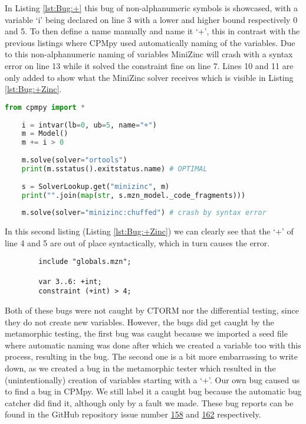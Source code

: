 In Listing \ref{lst:Bug:+} this bug of non-alphanumeric symbols is showcased, with a variable ‘i’ being declared on line 3 with a lower and higher bound respectively 0 and 5. To then define a name manually and name it ‘+’, this in contrast with the previous listings where CPMpy used automatically naming of the variables. Due to this non-alphanumeric naming of variables MiniZinc will crash with a syntax error on line 13 while it solved the constraint fine on line 7. Lines 10 and 11 are only added to show what the MiniZinc solver receives which is visible in Listing \ref{lst:Bug:+Zinc}. 

\begin{lstlisting}[language=python, label={lst:Bug:+}, caption={A bug showcasing that the naming of CPMpy’s variables is less strict than MiniZinc’s.}]
	from cpmpy import *
	
	i = intvar(lb=0, ub=5, name="+")
	m = Model()
	m += i > 0
	
	m.solve(solver="ortools")
	print(m.sstatus().exitstatus.name) # OPTIMAL
	
	s = SolverLookup.get("minizinc", m)
	print("".join(map(str, s.mzn_model._code_fragments)))
	
	m.solve(solver="minizinc:chuffed") # crash by syntax error
\end{lstlisting}

\noindent In this second listing (Listing \ref{lst:Bug:+Zinc}) we can clearly see that the ‘+’ of line 4 and 5 are out of place syntactically, which in turn causes the error.

\begin{lstlisting}[language=minizinc, label={lst:Bug:+Zinc}, caption={The resulting Zinc code from Listing \ref{lst:Bug:+} used by Minzinc.}]
		% Generated by CPMpy
		include "globals.mzn";
		
		var 3..6: +int;
		constraint (+int) > 4;
\end{lstlisting}

Both of these bugs were not caught by CTORM nor the differential testing, since they do not create new variables. However, the bugs did get caught by the metamorphic testing, the first bug was caught because we imported a seed file where automatic naming was done after which we created a variable too with this process, resulting in the bug. The second one is a bit more embarrassing to write down, as we created a bug in the metamorphic tester which resulted in the (unintentionally) creation of variables starting with a ‘+’. Our own bug caused us to find a bug in CPMpy. We still label it a caught bug because the automatic bug catcher did find it, although only by a fault we made. These bug reports can be found in the GitHub repository issue number \href{https://github.com/CPMpy/cpmpy/issues/158}{158} and \href{https://github.com/CPMpy/cpmpy/issues/162}{162} respectively.


